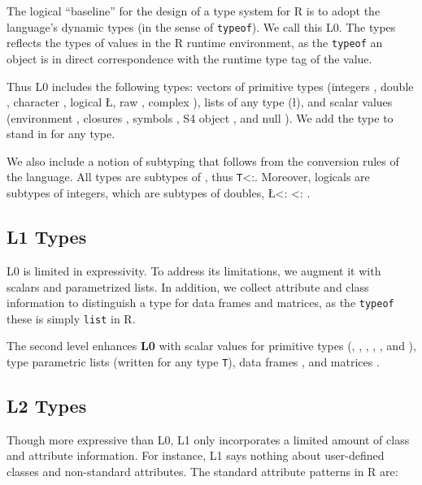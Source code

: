 \documentclass[acmsmall,10pt,review,anonymous]{acmart}\settopmatter{printfolios=true,printccs=false,printacmref=false}
\newcommand{\code}[1]{\lstinline|#1|\xspace}
\begin{document}
The logical ``baseline'' for the design of a type system for R is to adopt
the language's dynamic types (in the sense of \code{typeof}).  We call this
L0.  The types reflects the types of values in the R runtime environment, as
the \code{typeof} an object is in direct correspondence with the runtime
type tag of the value.

Thus L0 includes the following types: vectors of primitive types (integers
\I, double \D, character \C, logical \L, raw \R, complex \X), lists of any
type (\l), and scalar values (environment \sE, closures \sF, symbols \sY, S4
object \sS, and null \sN). We add the type \ANY to stand in for any type.

We also include a notion of subtyping that follows from the conversion rules
of the language.  All types are subtypes of \ANY, thus {\tt T}<:\ANY.
Moreover, logicals are subtypes of integers, which are subtypes of doubles,
\L <: \I <: \D.

\subsection{L1 Types}

L0 is limited in expressivity. To address its limitations, we augment it with
scalars and parametrized lists.  In addition, we collect attribute and class
information to distinguish a type for data frames and matrices, as the
\code{typeof} these is simply {\tt list} in R.

The second level enhances {\bf L0} with scalar values for primitive types
(\sI, \sD, \sC, \sL, \sR, and \sX), type parametric lists (written 
for any type {\tt T}), data frames , and matrices
.


\subsection{L2 Types}

Though more expressive than L0, L1 only incorporates a limited amount of
class and attribute information. For instance, L1 says nothing about user-defined
classes and non-standard attributes. The standard attribute patterns in R are:
\end{document}
